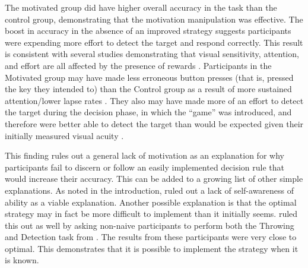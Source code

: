 \documentclass[vision,article,submit,moreauthors,pdftex,10pt,a4paper]{mdpi}
\begin{document}
The motivated group did have higher overall accuracy in the task than the control group, demonstrating that the motivation manipulation was effective. The boost in accuracy in the absence of an improved strategy suggests participants were expending more effort to detect the target and respond correctly. This result is consistent with several studies demonstrating that visual sensitivity, attention, and effort are all affected by the presence of rewards \cite{engelmann2007motivation, miranda2014intrinsic, manohar2017distinct}. Participants in the Motivated group may have made less erroneous button presses (that is, pressed the key they intended to) than the Control group as a result of more sustained attention/lower lapse rates \cite{massar2016rewards}. They also may have made more of an effort to detect the target during the decision phase, in which the “game” was introduced, and therefore were better able to detect the target than would be expected given their initially measured visual acuity \cite{miranda2014intrinsic}.

This finding rules out a general lack of motivation as an explanation for why participants fail to discern or follow an easily implemented decision rule that would increase their accuracy. This can be added to a growing list of other simple explanations. As noted in the introduction, \citeauthor{james2017failure} \cite{james2017failure} ruled out a lack of self-awareness of ability as a viable explanation.  Another possible explanation is that the optimal strategy may in fact be more difficult to implement than it initially seems. \citeauthor{Huntlearning} \cite{Huntlearning} ruled this out as well by asking non-naive participants to perform both the Throwing and Detection task from \citeauthor{clarke2015failure} \cite{clarke2015failure}. The results from these participants were very close to optimal. This demonstrates that it is possible to implement the strategy when it is known. 
\end{document}
